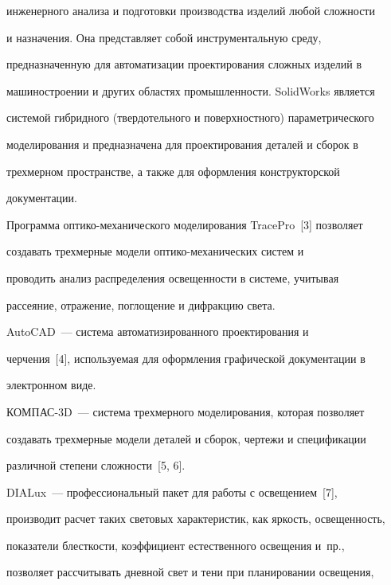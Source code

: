 инженерного анализа и подготовки производства изделий любой сложности 


и назначения. Она представляет собой инструментальную среду, 


предназначенную для автоматизации проектирования сложных изделий в 


машиностроении и других областях промышленности. SolidWorks является 


системой гибридного (твердотельного и поверхностного) параметрического 


моделирования и предназначена для проектирования деталей и сборок в 


трехмерном пространстве, а также для оформления конструкторской 


документации.


  


  Программа оптико-механического моделирования TracePro~[3] позволяет 


создавать трехмерные модели оп\-ти\-ко-ме\-ха\-ни\-че\-ских сис\-тем и 


проводить анализ распределения освещенности в сис\-те\-ме, учитывая 


рассеяние, отражение, поглощение и дифракцию света.


  


  AutoCAD~--- система автоматизированного проектирования и 


черчения~[4], используемая для оформления графической документации в 


электронном виде.


  


  КОМПАС-3D~--- система трехмерного моделирования, которая позволяет 


создавать трехмерные модели деталей и сборок, чертежи и спецификации 


различной степени сложности~[5, 6].


  


  DIALux~--- профессиональный пакет для работы с освещением~[7], 


производит расчет таких световых характеристик, как яркость, освещенность, 


показатели блесткости, коэффициент естественного освещения и~пр., 


позволяет рассчитывать дневной свет и тени при планировании освещения, 


